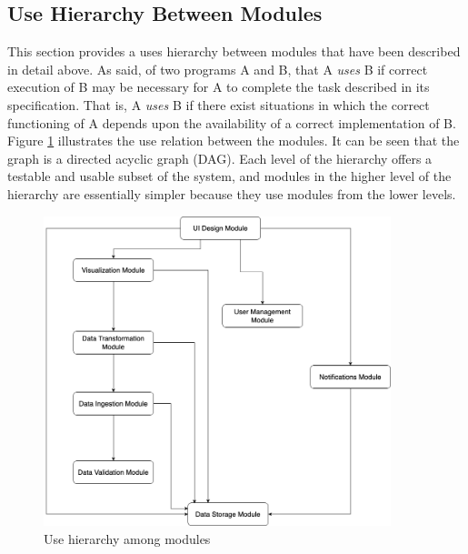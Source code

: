 \documentclass[12pt, titlepage]{article}
\begin{document}
\begin{description}
\begin{description}
\section{Use Hierarchy Between Modules} \label{SecUse}
This section provides a uses hierarchy between modules that have been described in detail 
above. As \citet{Parnas1978} said, of two programs A and B, that A {\em uses} B if correct 
execution of B may be necessary for A to complete the task described in its specification.
That is, A {\em uses} B if there exist situations in which the correct functioning of A 
depends upon the availability of a correct implementation of B.\\
\newline
Figure \ref{FigUH} illustrates the use relation between the modules. It can be seen that 
the graph is a directed acyclic graph (DAG). Each level of the hierarchy offers a testable
and usable subset of the system, and modules in the higher level of the hierarchy are 
essentially simpler because they use modules from the lower levels.

\begin{figure}[H]
\centering
\includegraphics[width=0.9\textwidth]{Diagrams/uses hierarchy.png}
\caption{Use hierarchy among modules}
\label{FigUH}
\end{figure}


\end{description}
\end{description}
\end{document}
